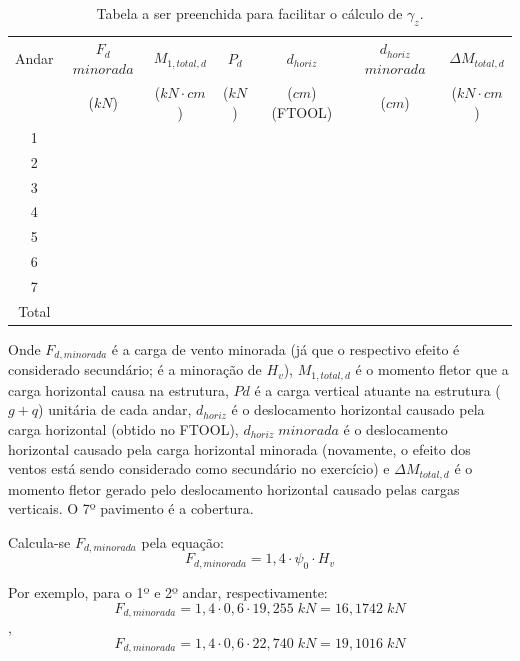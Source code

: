 \begin{table}[H]
\centering
\caption{Tabela a ser preenchida para facilitar o cálculo de $\gamma_z$.}
\label{tab:Tabela-exercicio-vento}
\begin{tabular}{c|c|c|ccc|c}
\hline
Andar & $F_d$ $minorada$ & $M_{1, total, d}$ & \multicolumn{1}{c|}{$P_d$} & \multicolumn{1}{c|}{$d_{horiz}$} & $d_{horiz}$ $minorada$ & $\Delta M_{total, d}$ \\
 & ($kN$) & ($kN\cdot cm$) & \multicolumn{1}{c|}{($kN$)} & \multicolumn{1}{c|}{($cm$) (FTOOL)} & ($cm$) & ($kN\cdot cm$) \\ \hline
1 &  &  & \multicolumn{1}{c|}{} & \multicolumn{1}{c|}{} &  &  \\
2 &  &  & \multicolumn{1}{c|}{} & \multicolumn{1}{c|}{} &  &  \\
3 &  &  & \multicolumn{1}{c|}{} & \multicolumn{1}{c|}{} &  &  \\
4 &  &  & \multicolumn{1}{c|}{} & \multicolumn{1}{c|}{} &  &  \\
5 &  &  & \multicolumn{1}{c|}{} & \multicolumn{1}{c|}{} &  &  \\
6 &  &  & \multicolumn{1}{c|}{} & \multicolumn{1}{c|}{} &  &  \\
7 &  &  & \multicolumn{1}{c|}{} & \multicolumn{1}{c|}{} &  &  \\ \hline
Total &  &  &  &  &  &  \\ \cline{1-1} \cline{3-3} \cline{7-7} 
\end{tabular}
\end{table}

Onde $F_{d, minorada}$ é a carga de vento minorada (já que o respectivo efeito é considerado secundário; é a minoração de $H_v$), $M_{1, total, d}$ é o momento fletor que a carga horizontal causa na estrutura, $Pd$ é a carga vertical atuante na estrutura ($g+q$) unitária de cada andar, $d_{horiz}$ é o deslocamento horizontal causado pela carga horizontal (obtido no FTOOL), $d_{horiz}\;minorada$ é o deslocamento horizontal causado pela carga horizontal minorada (novamente, o efeito dos ventos está sendo considerado como secundário no exercício) e $\Delta M_{total, d}$ é o momento fletor gerado pelo deslocamento horizontal causado pelas cargas verticais. O 7º pavimento é a cobertura.

Calcula-se $F_{d, minorada}$ pela equação:
\begin{equation}F_{d, minorada}=1,4\cdot\psi_0\cdot H_v\end{equation}

Por exemplo, para o 1º e 2º andar, respectivamente: $$F_{d, minorada}=1,4\cdot 0,6\cdot 19,255\;kN=16,1742\;kN$$, $$F_{d, minorada}=1,4\cdot 0,6\cdot 22,740\;kN=19,1016\;kN$$

